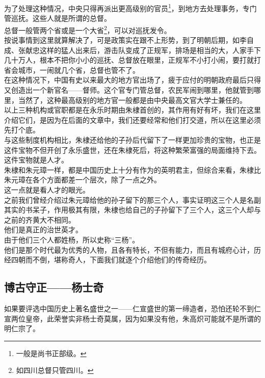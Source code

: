\begin{multicols}{\theparacolNo}
为了处理这种情况，中央只得再派出更高级别的官员\footnote{一般是尚书正部级。}，到地方去处理事务，专门管巡抚。这些人就是所谓的总督。\\

总督一般管两个省或是一个大省\footnote{如四川总督只管四川。}，可以对巡抚发令。\\

按说事情到这里就算解决了，可是政策实在跟不上形势，到了明朝后期，如李自成、张献忠这样的猛人出来后，游击队变成了正规军，排场是相当的大，人家手下几十万人，根本不把你小小的巡抚、总督放在眼里，正规军不小打小闹，要打就打省会城市，一闹就几个省，总督也管不了。\\

在这种情况下，中国有史以来最大的地方官出场了，疲于应付的明朝政府最后只得又创造出一个新官名——督师。这个官专门管总督，农民军闹到哪里，他就管到哪里，当然了，这种最高级别的地方官一般都是由中央最高文官大学士兼任的。\\

以上三种机构或官职都是在永乐时期由朱棣首创的，其作用有好有坏，我们在这里介绍它们，是因为在后面的文章中，我们还要经常和他们打交道，所以在这里必须先打个底。\\

与这些制度机构相比，朱棣还给他的子孙后代留下了一样更加珍贵的宝物，也正是这件宝物不但开创了永乐盛世，还在朱棣死后，将这种繁荣富强的局面维持下去。\\

这件宝物就是人才。\\

朱棣和朱元璋一样，都是中国历史上十分有作为的英明君主，但综合来看，朱棣比朱元璋在各个方面都差一个层次，除了一点之外。\\

这一点就是看人才的眼光。\\

之前我们曾经介绍过朱元璋给他的孙子留下的那三个人，事实证明这三个人是名副其实的书呆子，作用极其有限，朱棣也给自己的子孙留下了三个人，这三个人却与之前的齐黄大不相同。\\

他们是真正的治世英才。\\

由于他们三个人都姓杨，所以史称“三杨”。\\

他们是那个时代最为优秀的人物，且各有特长，不但有能力，而且有城府心计，历经四朝而不倒，堪称奇人，下面我们就逐个介绍他们的传奇经历。\\

\subsection{博古守正——杨士奇}
如果要评选中国历史上著名盛世之一——仁宣盛世的第一缔造者，恐怕还轮不到仁宣两位皇帝，此荣誉实非杨士奇莫属，因为如果没有他，朱高炽可能就不是所谓的明仁宗了。\\


\end{multicols}

